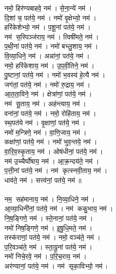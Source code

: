 {\small \closesection}




{\small \closesection}


नमो॒ हिर॑ण्यबाहवे॒ नम॑। से॒ना॒न्ये॑  नम॑। \\
दि॒शां च॒ पत॑ये॒ नम॑। नमो॑ वृ॒क्षेभ्यो॒ नम॑। \\
हरि॑केशेभ्यो॒  नम॑। प॒शू॒नां पत॑ये॒  नम॑। \\
नम॑ स॒स्पिञ्ज॑राय॒ नम॑। त्विषी॑मते॒ नम॑। \\
प॒थी॒नां पत॑ये॒ नम॑। नमो॑ बभ्लु॒शाय॒ नम॑। \\
वि॒व्या॒धिने॒ नम॑। अन्ना॑नां॒ पत॑ये॒ नम॑।  \\
नमो॒ हरि॑केशाय॒ नम॑। उ॒प॒वी॒तिने॒ नम॑। \\
पु॒ष्टानां॒ पत॑ये॒ नम॑। नमो॑ भ॒वस्य॑ हे॒त्यै नम॑। \\
जग॑तां॒ पत॑ये॒ नम॑। नमो॑ रु॒द्राय॒ नम॑। \\
आ॒त॒ता॒विने॒ नम॑। क्षेत्रा॑णां॒ पत॑ये॒ नम॑।  \\
नम॑ सू॒ताय॒ नम॑। अह॑न्त्याय॒ नम॑। \\
वना॑नां॒  पत॑ये॒ नम॑। नमो॒ रोहि॑ताय॒ नम॑। \\
स्थ॒पत॑ये नम॑। वृ॒क्षाणां॒ पत॑ये॒ नम॑। \\
नमो॑ म॒न्त्रिणे॒ नम॑। वा॒णि॒जाय॒ नम॑। \\
कक्षा॑णां॒ पत॑ये॒ नम॑। नमो॑ भुव॒न्तये॒ नम॑। \\
वा॒रि॒व॒स्कृ॒ताय॒ नम॑। ओष॑धीनां॒ पत॑ये॒ नम॑। \\
नम॑ उ॒च्चैर्घो॑षाय॒ नम॑। आ॒क्र॒न्दय॑ते॒ नम॑। \\
प॒त्ती॒नां पत॑ये॒ नम॑। नम॑ कृत्स्नवी॒ताय॒ नम॑। \\
धाव॑ते॒ नम॑। सत्त्व॑नां॒ पत॑ये॒ नम॑॥\\
\\
नम॒ सह॑मानाय॒ नम॑। नि॒व्या॒धिने॒ नम॑। \\
आ॒व्या॒धिनी॑नां॒ पत॑ये॒ नम॑। नम॑ ककु॒भाय॒ नम॑। \\
नि॒ष॒ङ्गिणे॒ नम॑। स्ते॒नानां॒ पत॑ये॒ नम॑। \\
नमो॑ निष॒ङ्गिणे॒ नम॑। इ॒षु॒धि॒मते॒ नम॑। \\
तस्क॑राणां॒ पत॑ये॒ नम॑। नमो॒ वञ्च॑ते॒ नम॑। \\
प॒रि॒वञ्च॑ते॒ नम॑। स्ता॒यू॒नां पत॑ये॒ नम॑। \\
नमो॑ निचे॒रवे॒ नम॑। प॒रि॒च॒राय॒ नम॑। \\
अर॑ण्यानां॒ पत॑ये॒ नम॑। नम॑ सृका॒विभ्यो॒ नम॑। \\
